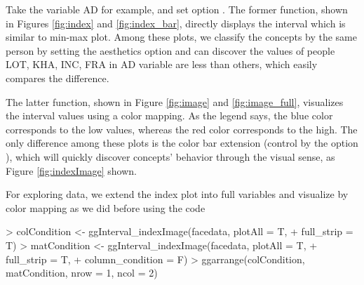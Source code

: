 \documentclass[article]{jss}
\begin{document}
Take the variable AD for example, and set option . The former function, shown in Figures \ref{fig:index} and \ref{fig:index_bar}, directly displays the interval which is similar to min-max plot. Among these plots, we classify the concepts by the same person by setting the aesthetics option  and can discover the values of people LOT, KHA, INC, FRA in AD variable are less than others, which easily compares the difference. 

The latter function, shown in Figure \ref{fig:image} and \ref{fig:image_full}, visualizes the interval values using a color mapping. As the legend says, the blue color corresponds to the low values, whereas the red color corresponds to the high. The only difference among these plots is the color bar extension (control by the option ), which will quickly discover concepts' behavior through the visual sense, as Figure \ref{fig:indexImage} shown.



For exploring data, we extend the index plot into full variables and visualize by color mapping as we did before using the code

\begin{Schunk}
\begin{Sinput}
> colCondition <- ggInterval_indexImage(facedata, plotAll = T,
+                                       full_strip = T) 
> matCondition <- ggInterval_indexImage(facedata, plotAll = T,
+                                       full_strip = T,
+                                       column_condition = F)
> ggarrange(colCondition, matCondition, nrow = 1, ncol = 2)
\end{Sinput}
\end{Schunk}
\end{document}
